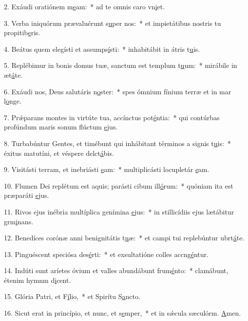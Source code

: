 2. Exáudi oratiónem m\uline{e}am:~* ad te omnis caro vn\uline{i}et.\par 
3. Verba iniquórum prævaluérunt s\uline{u}per nos:~* et impietátibus nostris tu propitib\uline{e}ris.\par 
4. Beátus quem elegísti et assumps\uline{í}sti:~* inhabitábit in átris t\uline{u}is.\par 
5. Replébimur in bonis domus tuæ, sanctum est templum t\uline{u}um:~* mirábile in æt\uline{á}te.\par 
6. Exáudi nos, Deus salutáris n\uline{o}ster:~* spes ómnium fínium terræ et in mar l\uline{o}nge.\par 
7. Prǽparans montes in virtúte tua, accínctus pot\uline{é}ntia:~* qui contúrbas profúndum maris sonum flúctum \uline{e}jus.\par 
8. Turbabúntur Gentes, et timébunt qui inhábitant términos a signis t\uline{u}is:~* éxitus matutíni, et véspere delct\uline{á}bis.\par 
9. Visitásti terram, et inebriásti \uline{e}am:~* multiplicásti locupletár \uline{e}am.\par 
10. Flumen Dei replétum est aquis; parásti cibum ill\uline{ó}rum:~* quóniam ita est præparáti \uline{e}jus.\par 
11. Rivos ejus inébria multíplica genímina \uline{e}jus:~* in stillicídiis ejus lætábitur grm\uline{i}nans.\par 
12. Benedíces corónæ anni benignitátis t\uline{u}æ:~* et campi tui replebúntur ubrt\uline{á}te.\par 
13. Pinguéscent speciósa des\uline{é}rti:~* et exsultatióne colles accng\uline{é}ntur.\par 
14. Indúti sunt aríetes óvium et valles abundábunt frum\uline{é}nto:~* clamábunt, étenim hymnm d\uline{i}cent.\par 
15. Glória Patri, et F\uline{í}lio,~* et Spirítu S\uline{a}ncto.\par 
16. Sicut erat in princípio, et nunc, et s\uline{e}mper,~* et in sǽcula sæculórm. \uline{A}men.\par 

